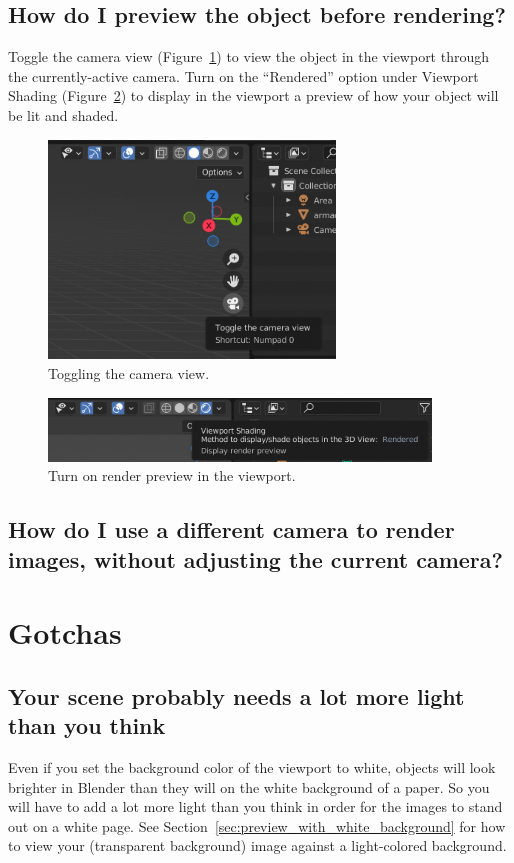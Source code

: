 \documentclass[10pt]{article}
\begin{document}
\subsection{How do I preview the object before rendering?}
\label{sec:FAQ-camera-view}
Toggle the camera view (Figure~\ref{fig:toggle-camera-view}) to view the object in the viewport through the currently-active camera. Turn on the ``Rendered'' option under Viewport Shading (Figure~\ref{fig:rendered-viewport-shading}) to display in the viewport a preview of how your object will be lit and shaded.
\begin{figure}[H]
    \centering
    \includegraphics[width=3in]{images/toggle-camera-view.png}
    \caption{Toggling the camera view.}
    \label{fig:toggle-camera-view}
\end{figure}
\begin{figure}[H]
    \centering
    \includegraphics[width=4in]{images/rendered-viewport-shading.png}
    \caption{Turn on render preview in the viewport.}
    \label{fig:rendered-viewport-shading}
\end{figure}

\subsection{How do I use a different camera to render images, without adjusting the current camera?}


\section{Gotchas}

\subsection{Your scene probably needs a lot more light than you think}
\label{subsec:light_intensity}
Even if you set the background color of the viewport to white, objects will look brighter in Blender than they will on the white background of a paper. So you will have to add a lot more light than you think in order for the images to stand out on a white page. See Section~\ref{sec:preview_with_white_background} for how to view your (transparent background) image against a light-colored background.
\end{document}
